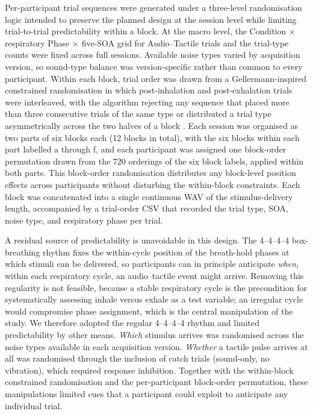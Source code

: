 Per-participant trial sequences were generated under a three-level randomisation logic intended to preserve the planned design at the session level while limiting trial-to-trial predictability within a block. At the macro level, the Condition $\times$ respiratory Phase $\times$ five-SOA grid for Audio--Tactile trials and the trial-type counts were fixed across full sessions. Available noise types varied by acquisition version, so sound-type balance was version-specific rather than common to every participant. Within each block, trial order was drawn from a Gellermann-inspired constrained randomisation in which post-inhalation and post-exhalation trials were interleaved, with the algorithm rejecting any sequence that placed more than three consecutive trials of the same type or distributed a trial type asymmetrically across the two halves of a block \citep{gellermann_1933}. Each session was organised as two parts of six blocks each (12 blocks in total), with the six blocks within each part labelled a through f, and each participant was assigned one block-order permutation drawn from the 720 orderings of the six block labels, applied within both parts. This block-order randomisation distributes any block-level position effects across participants without disturbing the within-block constraints. Each block was concatenated into a single continuous WAV of the stimulus-delivery length, accompanied by a trial-order CSV that recorded the trial type, SOA, noise type, and respiratory phase per trial.

A residual source of predictability is unavoidable in this design. The 4--4--4--4 box-breathing rhythm fixes the within-cycle position of the breath-hold phases at which stimuli can be delivered, so participants can in principle anticipate \emph{when}, within each respiratory cycle, an audio--tactile event might arrive. Removing this regularity is not feasible, because a stable respiratory cycle is the precondition for systematically assessing inhale versus exhale as a test variable; an irregular cycle would compromise phase assignment, which is the central manipulation of the study. We therefore adopted the regular 4--4--4--4 rhythm and limited predictability by other means. \emph{Which} stimulus arrives was randomised across the noise types available in each acquisition version. \emph{Whether} a tactile pulse arrives at all was randomised through the inclusion of catch trials (sound-only, no vibration), which required response inhibition. Together with the within-block constrained randomisation and the per-participant block-order permutation, these manipulations limited cues that a participant could exploit to anticipate any individual trial.

